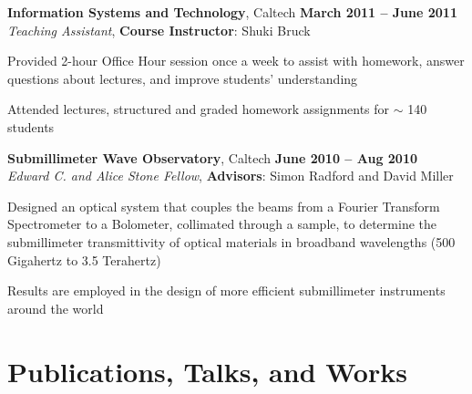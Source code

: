 \documentclass[margin,line]{resume}
\let\origsection\section%
\let\section\subsection%
\let\section\origsection%
\begin{document}
\begin{resume}
\textbf{Information Systems and Technology}, Caltech \hfill \textbf{March 2011 -- June 2011}\\
\textsl{Teaching Assistant}, \textbf{Course Instructor}: Shuki Bruck
\begin{list2}
  \item Provided 2-hour Office Hour session once a week to assist with homework, answer questions about lectures, and improve students' understanding
  \item Attended lectures, structured and graded homework assignments for $\sim$ 140 students
\end{list2}

\textbf{Submillimeter Wave Observatory}, Caltech \hfill \textbf{June 2010 -- Aug 2010}\\
\textsl{Edward C. and Alice Stone Fellow}, \textbf{Advisors}: Simon Radford and David Miller
\begin{list2}
  \item Designed an optical system that couples the beams from a Fourier Transform Spectrometer to a Bolometer, collimated through a sample, to determine the submillimeter transmittivity of optical materials in broadband wavelengths (500 Gigahertz to 3.5 Terahertz)
  \item Results are employed in the design of more efficient submillimeter instruments around the world
\end{list2}


\section{\mysidestyle Publications, Talks, and Works}


\end{resume}
\end{document}
